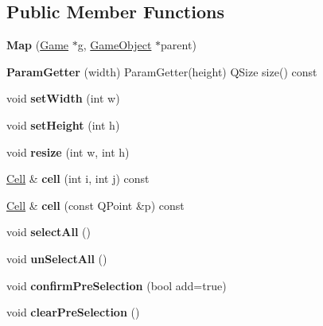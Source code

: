 \subsection*{\-Public \-Member \-Functions}
\begin{DoxyCompactItemize}
\item 
\hypertarget{class_map_a9779d0a2a759441c5e8d51b0a9c4cd40}{{\bfseries \-Map} (\hyperlink{class_game}{\-Game} $\ast$g, \hyperlink{class_game_object}{\-Game\-Object} $\ast$parent)}\label{class_map_a9779d0a2a759441c5e8d51b0a9c4cd40}

\item 
\hypertarget{class_map_a7361b86ab9523ed38bda3a7bbd131426}{{\bfseries \-Param\-Getter} (width) \-Param\-Getter(height) \-Q\-Size size() const }\label{class_map_a7361b86ab9523ed38bda3a7bbd131426}

\item 
\hypertarget{class_map_a2915ccde4d8a2ba8142677baea803467}{void {\bfseries set\-Width} (int w)}\label{class_map_a2915ccde4d8a2ba8142677baea803467}

\item 
\hypertarget{class_map_affab3537641a7985559f83ea083e00ca}{void {\bfseries set\-Height} (int h)}\label{class_map_affab3537641a7985559f83ea083e00ca}

\item 
\hypertarget{class_map_a5f7c31af6620d00ce8a812c8710345ab}{void {\bfseries resize} (int w, int h)}\label{class_map_a5f7c31af6620d00ce8a812c8710345ab}

\item 
\hypertarget{class_map_a6c94b3e99490efa0f170db132dc9f5b8}{\hyperlink{class_cell}{\-Cell} \& {\bfseries cell} (int i, int j) const }\label{class_map_a6c94b3e99490efa0f170db132dc9f5b8}

\item 
\hypertarget{class_map_ae0b03b422a10edbfa7bd0b4bdd085793}{\hyperlink{class_cell}{\-Cell} \& {\bfseries cell} (const \-Q\-Point \&p) const }\label{class_map_ae0b03b422a10edbfa7bd0b4bdd085793}

\item 
\hypertarget{class_map_a16aea6b5c9de3a26b094d964885b33b7}{void {\bfseries select\-All} ()}\label{class_map_a16aea6b5c9de3a26b094d964885b33b7}

\item 
\hypertarget{class_map_a5b85190575503a09c5c6de012da64f7c}{void {\bfseries un\-Select\-All} ()}\label{class_map_a5b85190575503a09c5c6de012da64f7c}

\item 
\hypertarget{class_map_a89cab58d82e08dacfe0b97899bab5501}{void {\bfseries confirm\-Pre\-Selection} (bool add=true)}\label{class_map_a89cab58d82e08dacfe0b97899bab5501}

\item 
\hypertarget{class_map_a0a637f44f0a59c3a67b6a507ae710c7f}{void {\bfseries clear\-Pre\-Selection} ()}\label{class_map_a0a637f44f0a59c3a67b6a507ae710c7f}

\end{DoxyCompactItemize}


